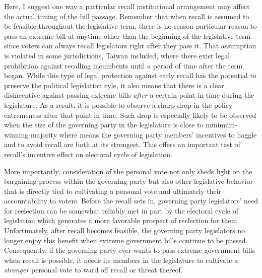 \documentclass{article}
\begin{document}
%		
		Here, I
		suggest one way
		a particular
		recall institutional arrangement may affect
		the actual timing of the bill passage.
		Remember that
		when recall is assumed to be feasible throughout the legislative term,
		there is no reason particular reason
		to pass an extreme bill at anytime other than the beginning of the legislative term
		since voters can always recall legislators
		right after they pass it.
		That assumption is violated
		in some jurisdictions, Taiwan included,
		where there exist legal prohibition against recalling incumbents
		until a period of time after the term began.
		While this type of legal protection against early recall
		has the potential to preserve the political legislation cyle,
		it also means that there is a clear disincentive
		against passing extreme bills
		\textit{after} a certain point in time during the legislature.
		As a result,
		it is possible to observe a sharp drop in
		the policy extremeness after that point in time.
		Such drop is especially likely to be observed
		when the size of the governing party
		in the legislature is close to minimum-winning majority
		where means the governing party members' incentives
		to haggle and to avoid recall
		are both at its strongest.
		This offers an important test of recall's
		incentive effect on electoral cycle of legislation.
		
		More importantly,
		consideration of the personal vote
		not only sheds light on the bargaining process within the governing party
		but also other legislative behavior
		that is directly tied to 
		cultivating a personal vote
		and ultimately their accountability to voters.
		Before the recall sets in,
		governing party legislators' need for reelection
		can be somewhat reliably met in part by the
		electoral cycle of legislation
		which generates a more favorable prospect of reelection for them.
		Unfortunately,
		after recall becomes feasible,
		the governing party legislators no longer enjoy this
		benefit when extreme government bills continue to be passed.
		Consequently,
		if the governing party ever wants to pass extreme government bills
		when recall is possible,
		it needs its members in the legislature to
		cultivate a \textit{stronger} personal vote
		to ward off recall or threat thereof.
		
\end{document}

